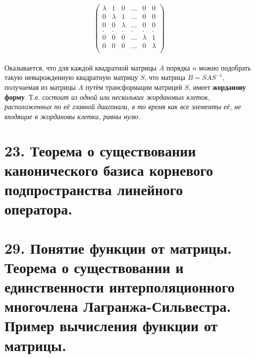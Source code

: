 \documentclass[14pt]{extarticle}
\begin{document}
\[\begin{pmatrix}
    \lambda & 1 & 0 & ... & 0 & 0 \\
    0 & \lambda & 1 & ... & 0 & 0 \\
    0 & 0 & \lambda & ... & 0 & 0 \\
    . & . & . & . & . & .         \\
    0 & 0 & 0 & ... & \lambda & 1 \\
    0 & 0 & 0 & ... & 0 & \lambda \\
\end{pmatrix}\]
\\
Оказывается, что для каждой квадратной матрицы $A$ порядка $n$ можно
подобрать такую невырожденную квадратную матрицу $S$, что матрица
$B = SAS^{-1}$, получаемая из матрицы $A$ путём трансформации 
матрицей $S$, имеет \textbf{жорданову форму}. Т.е. \textsl{состоит из 
одной или нескольких жордановых клеток, расположенных по её главной 
диагонали, в то время как все элементы её, не входящие в жордановы 
клетки, равны нулю.} 

\section{23.	
    Теорема о существовании канонического базиса корневого подпространства 
    линейного оператора.
}

\section{29.	
    Понятие функции от матрицы. Теорема о существовании и единственности 
    интерполяционного многочлена Лагранжа-Сильвестра. 
    Пример вычисления функции от матрицы.
}
\end{document}
